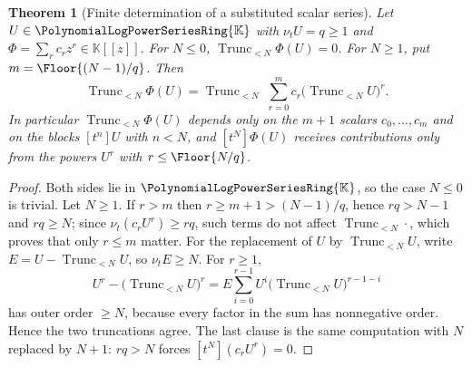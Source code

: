 \documentclass[11pt,oneside]{article}
\theoremstyle{plain}
\newtheorem{theorem}{Theorem}[section]
\theoremstyle{definition}
\theoremstyle{remark}
\newcommand{\K}{\mathbb{K}}
\newcommand{\PLpow}{\PolynomialLogPowerSeriesRing{\K}}   %
\newcommand{\ordt}{\nu_{t}}                              %
\newcommand{\Trunc}[2]{\operatorname{Trunc}_{<#2}#1}     %
\newcommand{\compose}{\mathbin{\circ}}
\begin{document}
\begin{theorem}[Finite determination of a substituted scalar series]
\label{plt:thm:dif-finite-determination}
Let \(U\in\PLpow\) with \(\ordt U=q\ge1\) and \(\Phi=\sum_{r}c_{r}z^{r}\in
\K[[z]]\).  For \(N\le0\), \(\Trunc{\Phi(U)}{N}=0\).  For \(N\ge1\), put
\(m=\Floor{(N-1)/q}\).  Then
\begin{equation}\label{plt:eq:dif-finite-determination}
  \Trunc{\Phi(U)}{N}
  =\Trunc{\;\sum_{r=0}^{m}c_{r}\bigl(\Trunc{U}{N}\bigr)^{r}}{N}.
\end{equation}
In particular \(\Trunc{\Phi(U)}{N}\) depends only on the \(m+1\) scalars
\(c_{0},\dots,c_{m}\) and on the blocks \([t^{n}]U\) with \(n<N\), and
\([t^{N}]\Phi(U)\) receives contributions only from the powers \(U^{r}\) with
\(r\le\Floor{N/q}\).
\end{theorem}

\begin{proof}
Both sides lie in \(\PLpow\), so the case \(N\le0\) is trivial.  Let \(N\ge1\).
If \(r>m\) then \(r\ge m+1>(N-1)/q\), hence \(rq>N-1\) and \(rq\ge N\); since
\(\ordt(c_{r}U^{r})\ge rq\), such terms do not affect
\(\Trunc{\cdot}{N}\), which proves that only \(r\le m\) matter.  For the
replacement of \(U\) by \(\Trunc{U}{N}\), write \(E=U-\Trunc{U}{N}\), so
\(\ordt E\ge N\).  For \(r\ge1\),
\[
  U^{r}-\bigl(\Trunc{U}{N}\bigr)^{r}
  =E\sum_{i=0}^{r-1}U^{i}\bigl(\Trunc{U}{N}\bigr)^{r-1-i}
\]
has outer order \(\ge N\), because every factor in the sum has nonnegative
order.  Hence the two truncations agree.  The last clause is the same
computation with \(N\) replaced by \(N+1\): \(rq>N\) forces
\([t^{N}](c_{r}U^{r})=0\).
\end{proof}
\end{document}
